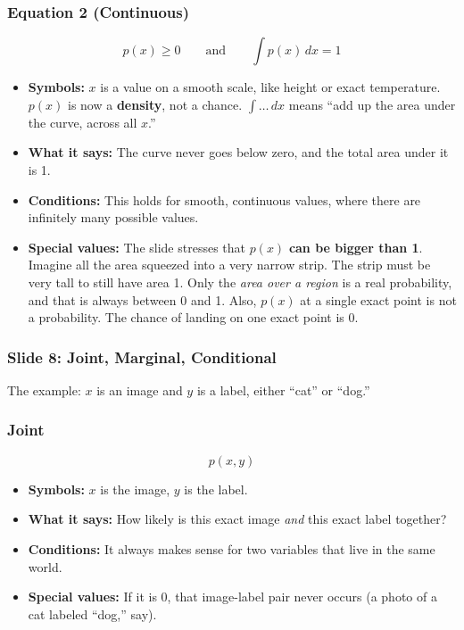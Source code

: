 \subsubsection*{Equation 2 (Continuous)}

\[
p(x) \ge 0 \qquad \text{and} \qquad \int p(x)\, dx = 1
\]

\begin{itemize}
  \item \textbf{Symbols:} $x$ is a value on a smooth scale, like height or exact temperature. $p(x)$ is now a \textbf{density}, not a chance. $\int \ldots\, dx$ means ``add up the area under the curve, across all $x$.''
  \item \textbf{What it says:} The curve never goes below zero, and the total area under it is 1.
  \item \textbf{Conditions:} This holds for smooth, continuous values, where there are infinitely many possible values.
  \item \textbf{Special values:} The slide stresses that $p(x)$ \textbf{can be bigger than 1}. Imagine all the area squeezed into a very narrow strip. The strip must be very tall to still have area 1. Only the \textit{area over a region} is a real probability, and that is always between 0 and 1. Also, $p(x)$ at a single exact point is not a probability. The chance of landing on one exact point is 0.
\end{itemize}

\subsubsection*{Slide 8: Joint, Marginal, Conditional}

The example: $x$ is an image and $y$ is a label, either ``cat'' or ``dog.''

\subsubsection*{Joint}

\[
p(x, y)
\]

\begin{itemize}
  \item \textbf{Symbols:} $x$ is the image, $y$ is the label.
  \item \textbf{What it says:} How likely is this exact image \textit{and} this exact label together?
  \item \textbf{Conditions:} It always makes sense for two variables that live in the same world.
  \item \textbf{Special values:} If it is 0, that image-label pair never occurs (a photo of a cat labeled ``dog,'' say).
\end{itemize}


